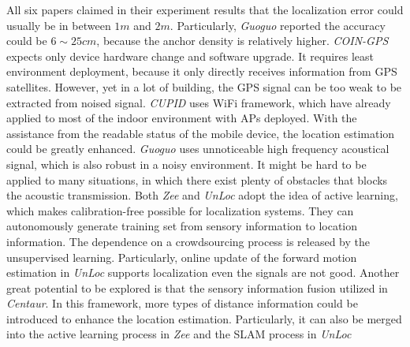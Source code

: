 \documentclass[letterpaper]{article}
\begin{document}
All six papers claimed in their experiment results that the localization error could usually be in between $ 1m $ and $ 2m $.
Particularly, \emph{Guoguo} reported the accuracy could be $ 6 \sim 25 cm $, because the anchor density is relatively higher.
\emph{COIN-GPS} expects only device hardware change and software upgrade.
It requires least environment deployment, because it only directly receives information from GPS satellites.
However, yet in a lot of building, the GPS signal can be too weak to be extracted from noised signal.
\emph{CUPID} uses WiFi framework, which have already applied to most of the indoor environment with APs deployed.
With the assistance from the readable status of the mobile device, the location estimation could be greatly enhanced.
\emph{Guoguo} uses unnoticeable high frequency acoustical signal, which is also robust in a noisy environment.
It might be hard to be applied to many situations, in which there exist plenty of obstacles that blocks the acoustic transmission.
Both \emph{Zee} and \emph{UnLoc} adopt the idea of active learning, which makes calibration-free possible for localization systems.
They can autonomously generate training set from sensory information to location information.
The dependence on a crowdsourcing process is released by the unsupervised learning.
Particularly, online update of the forward motion estimation in \emph{UnLoc} supports localization even the signals are not good.
Another great potential to be explored is that the sensory information fusion utilized in \emph{Centaur}.
In this framework, more types of distance information could be introduced to enhance the location estimation.
Particularly, it can also be merged into the active learning process in \emph{Zee} and the SLAM process in \emph{UnLoc}

 

\end{document}
